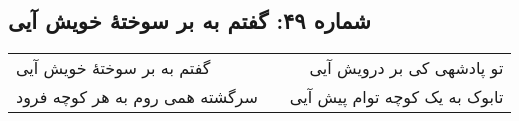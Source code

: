 \begin{center}
\section*{شماره ۴۹: گفتم به بر سوختۀ خویش آیی}
\label{sec:049}
\begin{longtable}{l p{0.5cm} r}
گفتم به بر سوختهٔ خویش آیی
&&
تو پادشهی کی بر درویش آیی
\\
سرگشته همی روم به هر کوچه فرود
&&
تابوک به یک کوچه توام پیش آیی
\\
\end{longtable}
\end{center}

